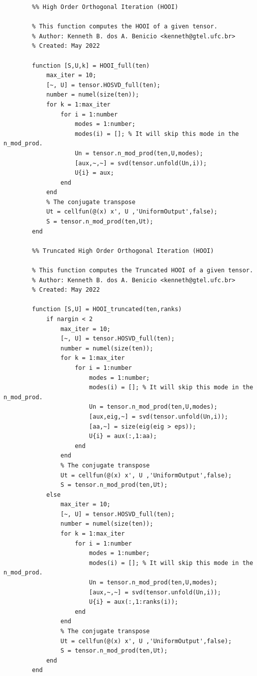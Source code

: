 \documentclass[a4paper,10pt]{article}
\begin{document}
    \begin{verbatim}
        %% High Order Orthogonal Iteration (HOOI)

        % This function computes the HOOI of a given tensor.   
        % Author: Kenneth B. dos A. Benicio <kenneth@gtel.ufc.br>
        % Created: May 2022

        function [S,U,k] = HOOI_full(ten)
            max_iter = 10;
            [~, U] = tensor.HOSVD_full(ten);
            number = numel(size(ten));
            for k = 1:max_iter
                for i = 1:number
                    modes = 1:number;
                    modes(i) = []; % It will skip this mode in the n_mod_prod.
                    Un = tensor.n_mod_prod(ten,U,modes);
                    [aux,~,~] = svd(tensor.unfold(Un,i));
                    U{i} = aux;
                end
            end
            % The conjugate transpose
            Ut = cellfun(@(x) x', U ,'UniformOutput',false);
            S = tensor.n_mod_prod(ten,Ut); 
        end

        %% Truncated High Order Orthogonal Iteration (HOOI)

        % This function computes the Truncated HOOI of a given tensor.   
        % Author: Kenneth B. dos A. Benicio <kenneth@gtel.ufc.br>
        % Created: May 2022

        function [S,U] = HOOI_truncated(ten,ranks)
            if nargin < 2
                max_iter = 10;
                [~, U] = tensor.HOSVD_full(ten);
                number = numel(size(ten));
                for k = 1:max_iter
                    for i = 1:number
                        modes = 1:number;
                        modes(i) = []; % It will skip this mode in the n_mod_prod.
                        Un = tensor.n_mod_prod(ten,U,modes);
                        [aux,eig,~] = svd(tensor.unfold(Un,i));
                        [aa,~] = size(eig(eig > eps));
                        U{i} = aux(:,1:aa);
                    end
                end
                % The conjugate transpose
                Ut = cellfun(@(x) x', U ,'UniformOutput',false);
                S = tensor.n_mod_prod(ten,Ut); 
            else
                max_iter = 10;
                [~, U] = tensor.HOSVD_full(ten);
                number = numel(size(ten));
                for k = 1:max_iter
                    for i = 1:number
                        modes = 1:number;
                        modes(i) = []; % It will skip this mode in the n_mod_prod.
                        Un = tensor.n_mod_prod(ten,U,modes);
                        [aux,~,~] = svd(tensor.unfold(Un,i));
                        U{i} = aux(:,1:ranks(i));
                    end
                end
                % The conjugate transpose
                Ut = cellfun(@(x) x', U ,'UniformOutput',false);
                S = tensor.n_mod_prod(ten,Ut); 
            end    
        end


\end{verbatim}
\end{document}
